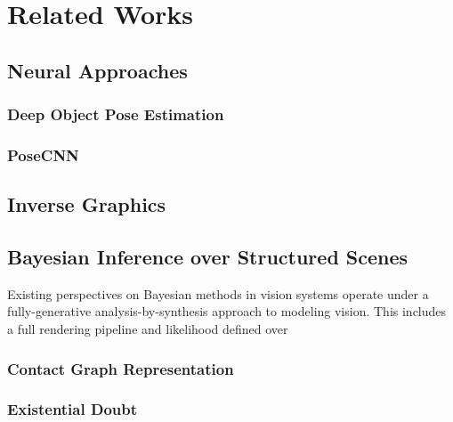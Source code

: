 
\section{Related Works}


  \subsection{Neural Approaches}

    \todo

    \subsubsection{Deep Object Pose Estimation}

      \todo
      \cite{DBLP:journals/corr/abs-1809-10790}

    \subsubsection{PoseCNN}

      \todo

  \subsection{Inverse Graphics}



  \subsection{Bayesian Inference over Structured Scenes}

    Existing perspectives on Bayesian methods in vision systems operate under a
    fully-generative analysis-by-synthesis approach to modeling vision. This
    includes a full rendering pipeline and likelihood defined over 

    \subsubsection{Contact Graph Representation}


    \subsubsection{Existential Doubt}

